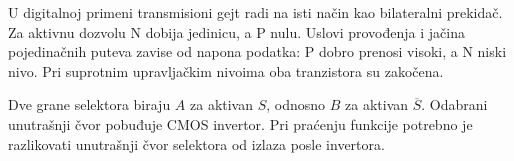 U digitalnoj primeni transmisioni gejt radi na isti način kao bilateralni prekidač. Za aktivnu dozvolu N dobija jedinicu, a P nulu. Uslovi provođenja i jačina pojedinačnih puteva zavise od napona podatka: P dobro prenosi visoki, a N niski nivo. Pri suprotnim upravljačkim nivoima oba tranzistora su zakočena.

Dve grane selektora biraju $A$ za aktivan $S$, odnosno $B$ za aktivan $\overline S$. Odabrani unutrašnji čvor pobuđuje CMOS invertor. Pri praćenju funkcije potrebno je razlikovati unutrašnji čvor selektora od izlaza posle invertora.
